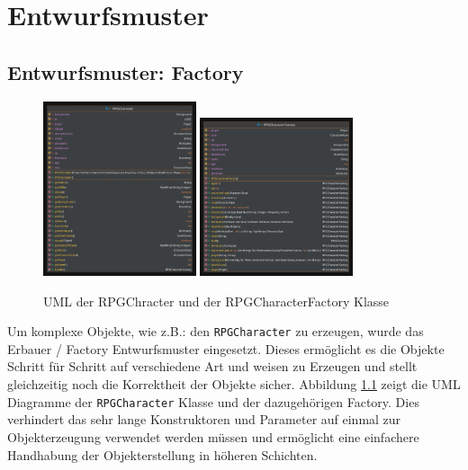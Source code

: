 \chapter{Entwurfsmuster}

\section{Entwurfsmuster:  Factory}
\begin{figure}[H]
	\centering
	\includegraphics[width=0.4\textwidth]{Bilder/RPGCharacter.pdf}
		\includegraphics[width=0.4\textwidth]{Bilder/RPGCharacterFactory.pdf}
	\caption{UML der RPGChracter und der RPGCharacterFactory Klasse}
	\label{fig:factory}
\end{figure}
Um komplexe Objekte, wie z.B.: den \texttt{RPGCharacter} zu erzeugen, wurde das Erbauer / Factory Entwurfsmuster eingesetzt. Dieses ermöglicht es die Objekte Schritt für Schritt auf verschiedene Art und weisen zu Erzeugen und stellt gleichzeitig noch die Korrektheit der Objekte sicher. Abbildung \ref{fig:factory} zeigt die UML Diagramme der \texttt{RPGCharacter} Klasse und der dazugehörigen Factory. Dies verhindert das sehr lange Konstruktoren und Parameter auf einmal zur Objekterzeugung verwendet werden müssen und ermöglicht eine einfachere Handhabung der Objekterstellung in höheren Schichten.

